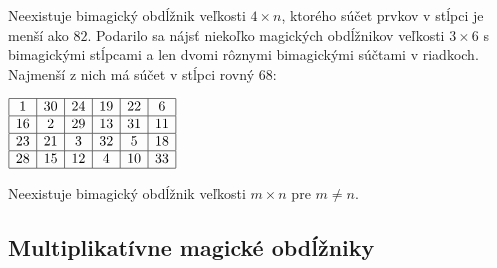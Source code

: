 \begin{result} Neexistuje bimagický obdĺžnik veľkosti $4 \times n$, ktorého súčet prvkov v stĺpci je menší ako $82$. Podarilo sa nájsť niekoľko magických obdĺžnikov veľkosti $3 \times 6$ s bimagickými stĺpcami a len dvomi rôznymi bimagickými súčtami v riadkoch. Najmenší z nich má súčet v stĺpci rovný $68$:
\end{result}

\begin{center}
$\begin{array}{ |c|c|c|c|c|c| } 
\hline
1 & 30 & 24 & 19 & 22 & 6 \\ 
\hline
16 & 2 & 29 & 13 & 31 & 11 \\ 
\hline
23 & 21 & 3 & 32 & 5 & 18 \\ 
\hline
28 & 15 & 12 & 4 & 10 & 33 \\ 
\hline
\end{array}$
\end{center}



\begin{hypothesis} Neexistuje bimagický obdĺžnik veľkosti $m \times n$ pre $m \neq n$.
\end{hypothesis}



\subsection{Multiplikatívne magické obdĺžniky}

